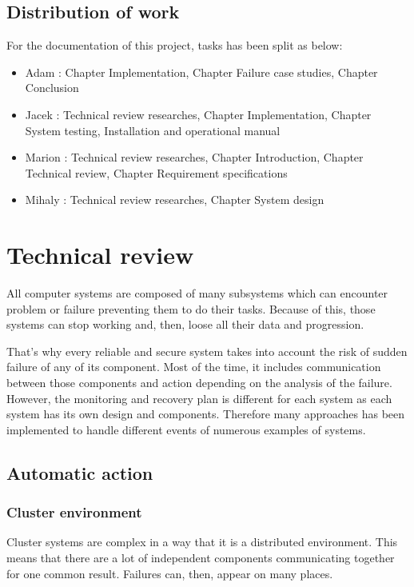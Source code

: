 \documentclass[10pt,a4paper]{report}
\begin{document}
\section{Distribution of work}
For the documentation of this project, tasks has been split as below:
\begin{itemize}
  \item Adam : Chapter Implementation, Chapter Failure case studies, Chapter Conclusion  
  \item Jacek : Technical review researches, Chapter Implementation, Chapter System testing, Installation and operational manual
  \item Marion : Technical review researches, Chapter Introduction, Chapter Technical review, Chapter Requirement specifications
  \item Mihaly : Technical review researches, Chapter System design
\end{itemize}

\chapter{Technical review}
\label{ch:tech}
All computer systems are composed of many subsystems which can encounter problem or failure preventing them to do their tasks. Because of this, those systems can stop working and, then, loose all their data and progression.

That's why every reliable and secure system takes into account the risk of sudden failure of any of its component. Most of the time, it includes communication between those components and action depending on the analysis of the failure. However, the monitoring and recovery plan is different for each system as each system has its own design and components. Therefore many approaches has been implemented to handle different events of numerous examples of systems. 

\section{Automatic action}
\subsection{Cluster environment}
Cluster systems are complex in a way that it is a distributed environment. This means that there are a lot of independent components communicating together for one common result. Failures can, then, appear on many places. 
\end{document}
